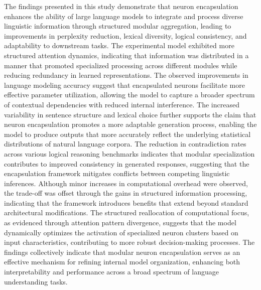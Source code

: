 \documentclass{article}
\begin{document}
The findings presented in this study demonstrate that neuron encapsulation enhances the ability of large language models to integrate and process diverse linguistic information through structured modular aggregation, leading to improvements in perplexity reduction, lexical diversity, logical consistency, and adaptability to downstream tasks. The experimental model exhibited more structured attention dynamics, indicating that information was distributed in a manner that promoted specialized processing across different modules while reducing redundancy in learned representations. The observed improvements in language modeling accuracy suggest that encapsulated neurons facilitate more effective parameter utilization, allowing the model to capture a broader spectrum of contextual dependencies with reduced internal interference. The increased variability in sentence structure and lexical choice further supports the claim that neuron encapsulation promotes a more adaptable generation process, enabling the model to produce outputs that more accurately reflect the underlying statistical distributions of natural language corpora. The reduction in contradiction rates across various logical reasoning benchmarks indicates that modular specialization contributes to improved consistency in generated responses, suggesting that the encapsulation framework mitigates conflicts between competing linguistic inferences. Although minor increases in computational overhead were observed, the trade-off was offset through the gains in structured information processing, indicating that the framework introduces benefits that extend beyond standard architectural modifications. The structured reallocation of computational focus, as evidenced through attention pattern divergence, suggests that the model dynamically optimizes the activation of specialized neuron clusters based on input characteristics, contributing to more robust decision-making processes. The findings collectively indicate that modular neuron encapsulation serves as an effective mechanism for refining internal model organization, enhancing both interpretability and performance across a broad spectrum of language understanding tasks.




\end{document}

